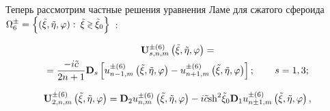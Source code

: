 %
%
%
%
%

Теперь рассмотрим частные решения уравнения Ламе для сжатого сфероида $\Omega _6^ \pm = \Big\{ {(\tilde \xi ,\tilde \eta ,\varphi ):{\mkern 1mu} {\mkern 1mu} {\kern 1pt} \tilde \xi  \mathbin{\lower.3ex\hbox{$\buildrel>\over
{\smash{\scriptstyle<}\vphantom{_x}}$}} {{\tilde \xi }_0}} \Big\}$~\cite{Nikolaev1993}:

\begin{multline}\label{eq:1:71}
{\bf{U}}_{s,n,m}^{ \pm (6)}\left( {\tilde \xi ,\tilde \eta ,\varphi } \right) = \\
= \frac{{ - i\tilde c}}{{2n + 1}}{{\bf{D}}_s}\left[ {u_{n - 1,m}^{ \pm (6)}\left( {\tilde \xi ,\tilde \eta ,\varphi } \right) - u_{n + 1,m}^{ \pm (6)}\left( {\tilde \xi ,\tilde \eta ,\varphi } \right)} \right];\qquad {\kern 1pt} s = 1,3;
\end{multline}

\begin{equation}\label{eq:1:72}
{\bf{U}}_{2,n,m}^{ \pm (6)}\left( {\tilde \xi ,\tilde \eta ,\varphi } \right) = {{\bf{D}}_2}u_{n,m}^{ \pm (6)}\left( {\tilde \xi ,\tilde \eta ,\varphi } \right) - i\tilde c{{\mathop{\rm sh}\nolimits} ^2}{\tilde \xi _0}{{\bf{D}}_1}u_{n \pm 1,m}^{ \pm (6)}\left( {\tilde \xi ,\tilde \eta ,\varphi } \right),
\end{equation}

